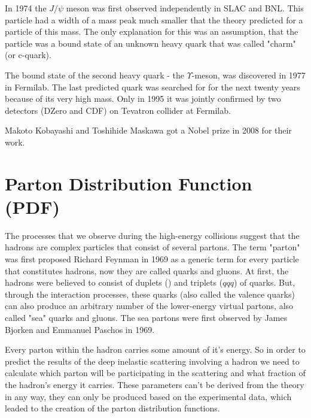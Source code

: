 In 1974 the $J/\psi$ meson was first observed independently in SLAC and BNL. This particle had a width of a mass peak much smaller that the theory predicted for a particle of this mass. The only explanation for this was an assumption, that the particle was a bound state of an unknown heavy quark that was called "charm" (or c-quark).

The bound state of the second heavy quark - the $\Upsilon$-meson, was discovered in 1977 in Fermilab. The last predicted quark was searched for for the next twenty years because of its very high mass. Only in 1995 it was jointly confirmed by two detectors (DZero and CDF) on Tevatron collider at Fermilab.

Makoto Kobayashi and Toshihide Maskawa got a Nobel prize in 2008 for their work.

\section{Parton Distribution Function (PDF)}
The processes that we observe during the high-energy collisions suggest that the hadrons are complex particles that consist of several partons. The term "parton" was first proposed Richard Feynman in 1969 as a generic term for every particle that constitutes hadrons, now they are called quarks and gluons. At first, the hadrons were believed to consist of duplets (\qqbar) and triplets ($qqq$) of quarks. But, through the interaction processes, these quarks (also called the valence quarks) can also produce an arbitrary number of the lower-energy virtual partons, also called "sea" quarks and gluons. The sea partons were first observed by James Bjorken and Emmanuel  Paschos in 1969.

Every parton within the hadron carries some amount of it's energy. So in order to predict the results of the deep inelastic scattering involving a hadron we need to calculate which parton will be participating in the scattering and what fraction of the hadron's energy it carries. These parameters can't be derived from the theory in any way, they can only be produced based on the experimental data, which leaded to the creation of the parton distribution functions.

